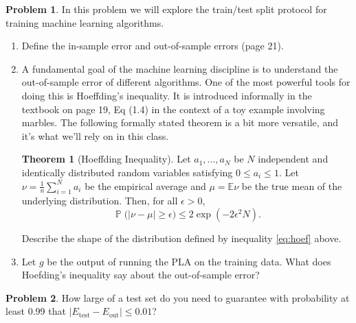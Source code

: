 \documentclass[10pt]{exam}
\theoremstyle{definition}
\newtheorem{problem}{Problem}
\newtheorem{theorem}{Theorem}
\newcommand{\E}{\mathbb E}
\DeclareMathOperator{\prob}{\mathbb P}
\newcommand{\Eout}{E_{\text{out}}}
\newcommand{\Etest}{E_{\text{test}}}
\begin{document}
\newpage
\begin{problem}
    In this problem we will explore the train/test split protocol for training machine learning algorithms.
    \begin{enumerate}
        \item Define the in-sample error and out-of-sample errors (page 21).
            \vspace{3in}
        \item A fundamental goal of the machine learning discipline is to understand the out-of-sample error of different algorithms.
            One of the most powerful tools for doing this is Hoeffding's inequality.
            It is introduced informally in the textbook on page 19, Eq (1.4) in the context of a toy example involving marbles.
            The following formally stated theorem is a bit more versatile, and it's what we'll rely on in this class.
            \begin{theorem}[Hoeffding Inequality]
                Let $a_1, ..., a_N$ be $N$ independent and identically distributed random variables satisfying $0 \le a_i \le 1$.
                Let $\nu = \tfrac1n\sum_{i=1}^N a_i$ be the empirical average and $\mu = \E \nu$ be the true mean of the underlying distribution.
                Then, for all $\epsilon > 0$,
                \begin{equation}
                    \label{eq:hoef}
                    \prob\big(|\nu - \mu| \ge \epsilon\big)
                    \le 
                    2 \exp (-2\epsilon^2 N)
                    .
                \end{equation}
            \end{theorem}
            Describe the shape of the distribution defined by inequality \ref{eq:hoef} above.

        \newpage
        \item Let $g$ be the output of running the PLA on the training data.
            What does Hoefding's inequality say about the out-of-sample error?
            \vspace{6in}


    \end{enumerate}
\end{problem}
\newpage
\begin{problem}
    How large of a test set do you need to guarantee with probability at least 0.99 that $|\Etest-\Eout| \le 0.01$?
\end{problem}
\end{document}
